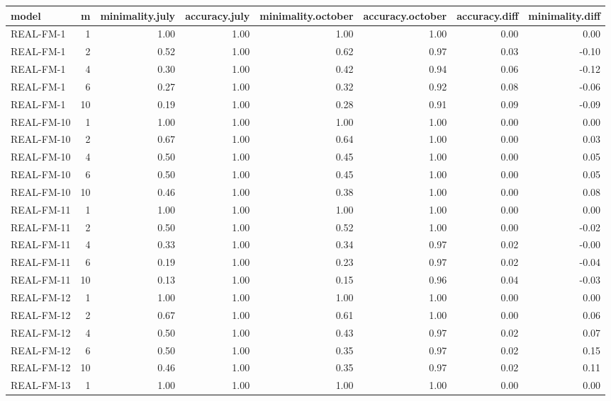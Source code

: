 \begin{table}[ht]
\centering
\begin{tabular}{lrrrrrrr}
  \hline
model & m & minimality.july & accuracy.july & minimality.october & accuracy.october & accuracy.diff & minimality.diff \\ 
  \hline
REAL-FM-1 &   1 & 1.00 & 1.00 & 1.00 & 1.00 & 0.00 & 0.00 \\ 
  REAL-FM-1 &   2 & 0.52 & 1.00 & 0.62 & 0.97 & 0.03 & -0.10 \\ 
  REAL-FM-1 &   4 & 0.30 & 1.00 & 0.42 & 0.94 & 0.06 & -0.12 \\ 
  REAL-FM-1 &   6 & 0.27 & 1.00 & 0.32 & 0.92 & 0.08 & -0.06 \\ 
  REAL-FM-1 &  10 & 0.19 & 1.00 & 0.28 & 0.91 & 0.09 & -0.09 \\ 
  REAL-FM-10 &   1 & 1.00 & 1.00 & 1.00 & 1.00 & 0.00 & 0.00 \\ 
  REAL-FM-10 &   2 & 0.67 & 1.00 & 0.64 & 1.00 & 0.00 & 0.03 \\ 
  REAL-FM-10 &   4 & 0.50 & 1.00 & 0.45 & 1.00 & 0.00 & 0.05 \\ 
  REAL-FM-10 &   6 & 0.50 & 1.00 & 0.45 & 1.00 & 0.00 & 0.05 \\ 
  REAL-FM-10 &  10 & 0.46 & 1.00 & 0.38 & 1.00 & 0.00 & 0.08 \\ 
  REAL-FM-11 &   1 & 1.00 & 1.00 & 1.00 & 1.00 & 0.00 & 0.00 \\ 
  REAL-FM-11 &   2 & 0.50 & 1.00 & 0.52 & 1.00 & 0.00 & -0.02 \\ 
  REAL-FM-11 &   4 & 0.33 & 1.00 & 0.34 & 0.97 & 0.02 & -0.00 \\ 
  REAL-FM-11 &   6 & 0.19 & 1.00 & 0.23 & 0.97 & 0.02 & -0.04 \\ 
  REAL-FM-11 &  10 & 0.13 & 1.00 & 0.15 & 0.96 & 0.04 & -0.03 \\ 
  REAL-FM-12 &   1 & 1.00 & 1.00 & 1.00 & 1.00 & 0.00 & 0.00 \\ 
  REAL-FM-12 &   2 & 0.67 & 1.00 & 0.61 & 1.00 & 0.00 & 0.06 \\ 
  REAL-FM-12 &   4 & 0.50 & 1.00 & 0.43 & 0.97 & 0.02 & 0.07 \\ 
  REAL-FM-12 &   6 & 0.50 & 1.00 & 0.35 & 0.97 & 0.02 & 0.15 \\ 
  REAL-FM-12 &  10 & 0.46 & 1.00 & 0.35 & 0.97 & 0.02 & 0.11 \\ 
  REAL-FM-13 &   1 & 1.00 & 1.00 & 1.00 & 1.00 & 0.00 & 0.00 \\ 

\end{tabular}
\end{table}
